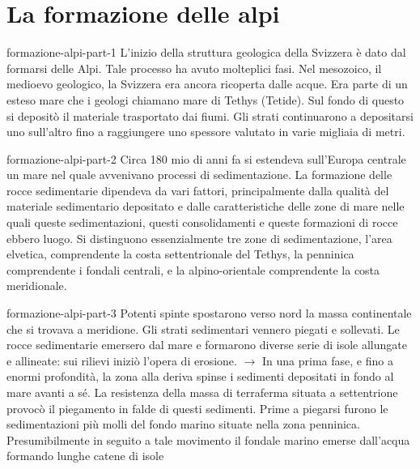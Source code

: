 \documentclass[preview]{standalone}
\begin{document}
\genpage

\section{La formazione delle alpi}

\begin{snippet}{formazione-alpi-part-1}
    L'inizio della struttura geologica della Svizzera è dato dal formarsi delle Alpi. Tale processo ha avuto
    molteplici fasi. Nel mesozoico, il medioevo geologico, la Svizzera era ancora ricoperta dalle acque.
    Era parte di un esteso mare che i geologi chiamano mare di Tethys (Tetide). Sul fondo di questo si
    depositò il materiale trasportato dai fiumi. Gli strati continuarono a depositarsi uno sull'altro fino a
    raggiungere uno spessore valutato in varie migliaia di metri.
\end{snippet}


\begin{snippet}{formazione-alpi-part-2}
    Circa 180 mio di anni fa si estendeva sull'Europa centrale un mare nel quale avvenivano
    processi di sedimentazione.
    La formazione delle rocce sedimentarie dipendeva da vari fattori, principalmente dalla qualità del
    materiale sedimentario depositato e dalle caratteristiche delle zone di mare nelle quali queste
    sedimentazioni, questi consolidamenti e queste formazioni di rocce ebbero luogo. Si distinguono
    essenzialmente tre zone di sedimentazione, l'area elvetica, comprendente la costa settentrionale
    del Tethys, la penninica comprendente i fondali centrali, e la alpino-orientale comprendente la
    costa meridionale.
\end{snippet}


\begin{snippet}{formazione-alpi-part-3}
    Potenti spinte spostarono verso nord la massa continentale che si trovava a meridione. Gli
    strati sedimentari vennero piegati e sollevati. Le rocce sedimentarie emersero dal mare e
    formarono diverse serie di isole allungate e allineate: sui rilievi iniziò l'opera di erosione. \(\rightarrow\) In una
    prima fase, e fino a enormi profondità, la zona alla deriva spinse i sedimenti depositati in fondo al
    mare avanti a sé. La resistenza della massa di terraferma situata a settentrione provocò il
    piegamento in falde di questi sedimenti. Prime a piegarsi furono le sedimentazioni più molli del
    fondo marino situate nella zona penninica. Presumibilmente in seguito a tale movimento il fondale
    marino emerse dall'acqua formando lunghe catene di isole
\end{snippet}
\end{document}
